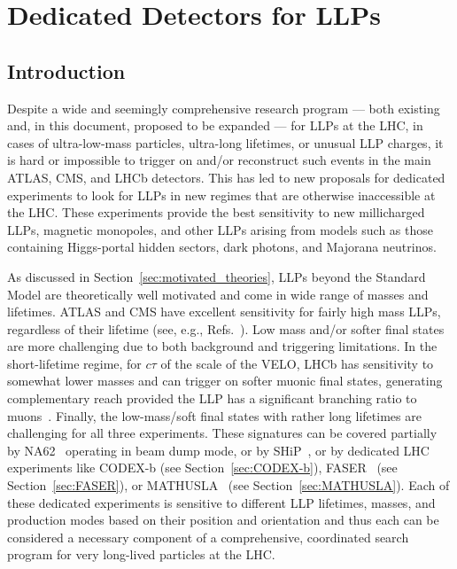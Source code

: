 \section{Dedicated Detectors for LLPs} \label{sec:dedicated}
\subsection{Introduction}

Despite a wide and seemingly comprehensive research program --- both existing and, in this document, proposed to be expanded --- for LLPs at the LHC, in cases of ultra-low-mass particles, ultra-long lifetimes, or unusual LLP charges, it is hard or impossible to trigger on and/or reconstruct such events in the main ATLAS, CMS, and LHCb detectors. This has led to new proposals for dedicated experiments to look for LLPs in new regimes that are otherwise inaccessible at the LHC. These experiments provide the best sensitivity to new millicharged LLPs, magnetic monopoles, and other LLPs arising from models such as those containing Higgs-portal hidden sectors, dark photons, and Majorana neutrinos.

As discussed in Section~\ref{sec:motivated_theories}, LLPs beyond the Standard Model are theoretically well motivated and come in wide range of masses and lifetimes. ATLAS and CMS have excellent sensitivity for fairly high mass LLPs, regardless of their lifetime (see, e.g., Refs.~\cite{CMS-PAS-EXO-16-036,Aaboud:2016dgf,CMS-PAS-EXO-16-003,Aaboud:2019opc}). Low mass and/or softer final states are more challenging due to both background and triggering limitations. In the short-lifetime regime, for $c\tau$ of the scale of the VELO, LHCb has sensitivity to somewhat lower masses and can trigger on softer muonic final states, generating complementary reach provided the LLP has a significant branching ratio to muons~\cite{Aaij:2017mic,Aaij:2016xmb,Aaij:2016isa,Aaij:2015ica,Aaij:2014nma}. Finally, the low-mass/soft final states with rather long lifetimes are challenging for all three experiments. These signatures can be covered partially by NA62~\cite{NA62:2017rwk} operating in beam dump mode, or by SHiP~\cite{Alekhin:2015byh}, or by dedicated LHC experiments like CODEX-b \cite{Gligorov:2017nwh} (see Section~\ref{sec:CODEX-b}), FASER~\cite{Feng:2017uoz} (see Section~\ref{sec:FASER}), or MATHUSLA~\cite{Chou:2016lxi} (see Section~\ref{sec:MATHUSLA}). Each of these dedicated experiments is sensitive to different LLP lifetimes, masses, and production modes based on their position and orientation and thus each can be considered a necessary component of a comprehensive, coordinated search program for very long-lived particles at the LHC.

